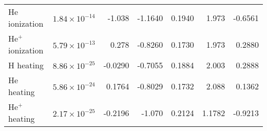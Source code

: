 \begin{table}
\begin{center}
\begin{tabular}{lrrrrrr}
He ionization &       $1.84 \times 10^{-14}$ & -1.038 & -1.1640 & 0.1940 & 1.973 & -0.6561 \\
He$^+$ ionization & $5.79 \times 10^{-13}$ & 0.278 & -0.8260 & 0.1730 & 1.973 & 0.2880 \\
H heating &            $8.86 \times 10^{-25}$ & -0.0290 & -0.7055 & 0.1884 & 2.003 & 0.2888 \\
He heating &         $5.86 \times 10^{-24}$ & 0.1764 & -0.8029 & 0.1732 & 2.088 & 0.1362 \\
He$^+$ heating &   $2.17 \times 10^{-25}$ & -0.2196 & -1.070 & 0.2124 & 1.1782 & -0.9213 \\
\end{tabular}
\label{table:homo_coefs}
\end{center}
\end{table}